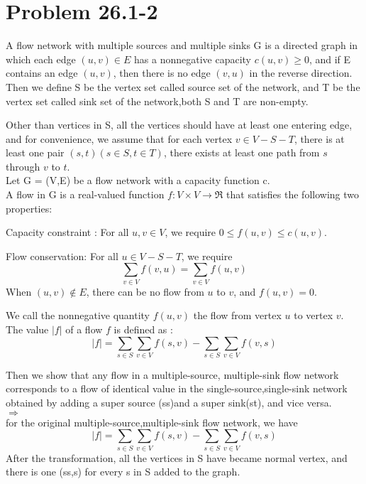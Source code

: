 \documentclass[oneside]{homework} %
\begin{document}
\maketitle
\newpage
\section {Problem 26.1-2} 

A flow network with multiple sources and multiple sinks G is a directed graph in which each edge $(u,v) \in E$ has a nonnegative capacity $c(u,v) \geq 0$, and if E contains an edge $(u,v)$, then there is no edge $(v,u)$ in the reverse direction. \\
Then we define S be the vertex set called source set of the network, and T be the vertex set called sink set of the network,both S and T are non-empty. 

Other than vertices in S, all the vertices should have at least one entering edge, and for convenience, we assume that for each vertex $v \in V-S-T$, there is at least one pair $(s,t)(s \in S, t \in T)$, there exists at least one path from $s$ through $v$ to $t$.\\

Let G = (V,E) be a flow network with a capacity function c. \\

A flow in G is a real-valued function $f : V \times V \rightarrow \Re$ that satisfies the following two properties:

Capacity constraint : For all $u,v \in V$, we require $0\leq f(u,v) \leq c(u,v)$.

Flow conservation: For all $u \in V - S - T$, we require
$$\sum\limits_{v \in V}f(v,u) =\sum\limits_{v \in V}f(u,v) $$
When $(u,v) \notin E$, there can be no flow from $u$ to $v$, and $f(u,v) = 0$.

We call the nonnegative quantity $f(u,v)$ the flow from vertex $u$ to vertex $v$. The value $|f|$ of a flow $f$ is defined as :
$$ |f| = \sum_{s \in S}\sum_{v \in V}f(s,v) - \sum_{s \in S}\sum_{v \in V}f(v,s) $$

Then we show that any flow in a multiple-source, multiple-sink flow network corresponds to a flow of identical value in the single-source,single-sink network obtained by adding a super source (ss)and a super sink(st), and vice versa. \\
$\Rightarrow$ \\
for the original multiple-source,multiple-sink flow network, we have\\ $$ |f| = \sum_{s \in S}\sum_{v \in V}f(s,v) - \sum_{s \in S}\sum_{v \in V}f(v,s) $$ 
After the transformation, all the vertices in S have became normal vertex, and there is one (ss,s) for every s in S added to the graph.
\end{document}
